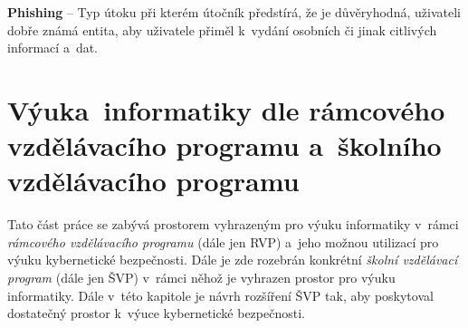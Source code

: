 \documentclass[a4paper, 12pt]{article}
\begin{document}
\textbf{Phishing} -- Typ útoku při kterém útočník předstírá, že je důvěryhodná, uživateli dobře známá entita, aby uživatele přiměl k~vydání osobních či jinak citlivých informací a~dat.


\newpage
\section{Výuka~informatiky dle rámcového vzdělávacího programu a~školního vzdělávacího programu}
Tato část práce se zabývá prostorem vyhrazeným pro výuku informatiky v~rámci \textit{rámcového vzdělávacího programu} (dále jen RVP) a~jeho možnou utilizací pro výuku kybernetické bezpečnosti. Dále je zde rozebrán konkrétní \textit{školní vzdělávací program} (dále jen ŠVP) v~rámci něhož je vyhrazen prostor pro výuku informatiky. Dále v~této kapitole je návrh rozšíření ŠVP tak, aby poskytoval dostatečný prostor k~výuce kybernetické bezpečnosti. 
\end{document}
